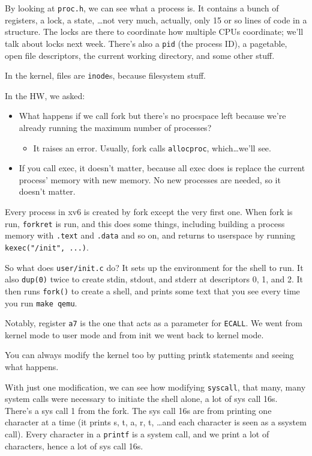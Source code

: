 By looking at \verb|proc.h|, we can see what a process is.
It contains a bunch of registers,
a lock, a state, \dots not very much, actually,
only 15 or so lines of code in a structure.
The locks are there to coordinate how multiple CPUs
coordinate; we'll talk about locks next week.
There's also a \verb|pid| (the process ID),
a pagetable, open file descriptors,
the current working directory, and some other stuff.

In the kernel, files are \verb|inode|s,
because filesystem stuff.

In the HW, we asked:
\begin{itemize}
    \item What happens if we call fork
    but there's no procspace left because we're already running
    the maximum number of processes?
    \begin{itemize}
        \item It raises an error.
        Usually, fork calls \verb|allocproc|,
        which\dots we'll see.
    \end{itemize}
    \item If you call exec,
    it doesn't matter, because all exec does is
    replace the current process' memory with new memory.
    No new processes are needed, so it doesn't matter.
\end{itemize}

Every process in xv6 is created by fork except the very first one.
When fork is run, \verb|forkret| is run,
and this does some things,
including building a process memory with
\verb|.text| and \verb|.data| and so on,
and returns to userspace
by running \verb|kexec("/init", ...)|.

So what does \verb|user/init.c| do?
It sets up the environment for the shell to run.
It also \verb|dup(0)| twice to create stdin,
stdout, and stderr at descriptors 0, 1, and 2.
It then runs \verb|fork()|
to create a shell,
and prints some text that you see every time you run \verb|make qemu|.

Notably, register \verb|a7| is the one that
acts as a parameter for \verb|ECALL|.
We went from kernel mode to user mode
and from init we went back to kernel mode.

You can always modify the kernel too by putting printk statements
and seeing what happens.

With just one modification,
we can see how modifying \verb|syscall|,
that many, many system calls were necessary
to initiate the shell alone,
a lot of sys call 16s.
There's a sys call 1 from the fork.
The sys call 16s are from printing one character at a time
(it prints s, t, a, r, t, \dots and each character
is seen as a ssystem call).  Every character in a \verb|printf|
is a system call, and we print a lot of characters,
hence a lot of sys call 16s.

